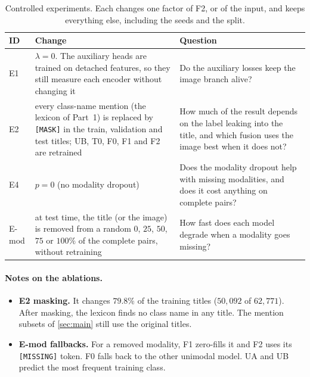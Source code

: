 \begin{table}[H]
  \centering\small
  \caption{Controlled experiments. Each changes one factor of F2, or of the input, and keeps everything else, including
  the seeds and the split.}
  \label{tab:ablations}
  \begin{tabularx}{\linewidth}{@{}lYY@{}}
    \toprule
    ID & Change & Question \\
    \midrule
    E1 & $\lambda = 0$. The auxiliary heads are trained on detached features, so they still measure each encoder without changing it & Do the auxiliary losses keep the image branch alive? \\
    E2 & every class-name mention (the lexicon of Part~1) is replaced by \texttt{[MASK]} in the train, validation and test titles; UB, T0, F0, F1 and F2 are retrained & How much of the result depends on the label leaking into the title, and which fusion uses the image best when it does not? \\
    E4 & $p = 0$ (no modality dropout) & Does the modality dropout help with missing modalities, and does it cost anything on complete pairs? \\
    E-mod & at test time, the title (or the image) is removed from a random $0$, $25$, $50$, $75$ or $100\%$ of the complete pairs, without retraining & How fast does each model degrade when a modality goes missing? \\
    \bottomrule
  \end{tabularx}
\end{table}

\paragraph{Notes on the ablations.}
\begin{itemize}
  \item \textbf{E2 masking.} It changes $79.8\%$ of the training titles ($50{,}092$ of $62{,}771$). After masking, the
        lexicon finds no class name in any title. The mention subsets of \cref{sec:main} still use the original
        titles.
  \item \textbf{E-mod fallbacks.} For a removed modality, F1 zero-fills it and F2 uses its \texttt{[MISSING]} token.
        F0 falls back to the other unimodal model. UA and UB predict the most frequent training class.
\end{itemize}

